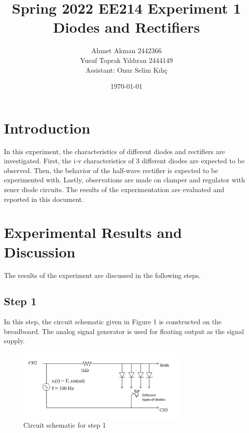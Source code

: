 \documentclass[letterpaper,12pt]{article}
\begin{document}
\thispagestyle{empty}

\title{Spring 2022 EE214 Experiment 1  \protect\\ Diodes and Rectifiers}
\author{Ahmet Akman 2442366 \protect\\ Yusuf Toprak Yıldıran 2444149 \protect\\ Assistant: Onur Selim Kılıç}
\date{\today}
\maketitle
\tableofcontents
\section{Introduction}
In this experiment, the characteristics of different diodes and rectifiers are investigated. First, the i-v characteristics of 3 different diodes are expected to be observed. Then, the behavior of the half-wave rectifier is expected to be experimented with. Lastly, observations are made on clamper and regulator with zener diode circuits. The results of the experimentation are evaluated and reported in this document.
\section{Experimental Results and Discussion}
The results of the experiment are discussed in the following steps.
\subsection{Step 1}
In this step, the circuit schematic given in Figure 1 is constructed on the breadboard. The analog signal generator is used for floating output as the signal supply.
\begin{figure}[H]
\centering
\includegraphics[width = 0.75\textwidth]{1_1.png}
\caption{Circuit schematic for step 1}
\end{figure} 
\end{document}
